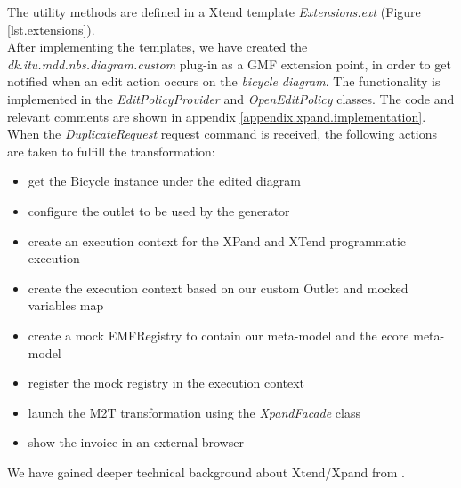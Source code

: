 \noindent The utility methods are defined in a Xtend template
\emph{Extensions.ext} (Figure \ref{lst.extensions}).\\

\noindent After implementing the templates, we have created the
\emph{dk.itu.mdd.nbs.diagram.custom} plug-in as a GMF extension point, in order
to get notified when an edit action occurs on the \emph{bicycle diagram}. The
functionality is implemented in the \emph{EditPolicyProvider} and
\emph{OpenEditPolicy} classes. The code and relevant comments are shown in
appendix \ref{appendix.xpand.implementation}. When the \emph{DuplicateRequest} request command is received,
the following actions are taken to fulfill the transformation:
\begin{itemize}
  \item get the Bicycle instance under the edited diagram
  \item configure the outlet to be used by the generator
  \item create an execution context for the XPand and XTend programmatic
  execution
  \item create the execution context based on our custom Outlet and
  mocked variables map
  \item create a mock EMFRegistry to contain our meta-model and the
  ecore meta-model
  \item register the mock registry in the execution context
  \item launch the M2T transformation using the \emph{XpandFacade} class
  \item show the invoice in an external browser\\
\end{itemize}

\noindent We have gained deeper technical background about Xtend/Xpand from
\cite{XPAND_EXAMPLE}.
